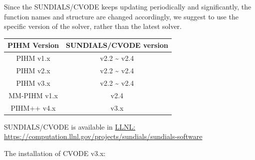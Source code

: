 \documentclass[]{scrbook}
\begin{document}
Since the SUNDIALS/CVODE keeps updating periodically and significantly,
the function names and structure are changed accordingly, we suggest to
use the specific version of the solver, rather than the latest solver.

\begin{longtable}[]{@{}cc@{}}
\toprule
PIHM Version & SUNDIALS/CVODE version\tabularnewline
\midrule
\endhead
PIHM v1.x & v2.2 \textasciitilde{} v2.4\tabularnewline
PIHM v2.x & v2.2 \textasciitilde{} v2.4\tabularnewline
PIHM v3.x & v2.2 \textasciitilde{} v2.4\tabularnewline
MM-PIHM v1.x & v2.4\tabularnewline
PIHM++ v4.x & v3.x\tabularnewline
\bottomrule
\end{longtable}

SUNDIALS/CVODE is available in
\href{https://computation.llnl.gov/projects/sundials/sundials-software}{LLNL:
https://computation.llnl.gov/projects/sundials/sundials-software}

The installation of CVODE v3.x:
\end{document}

